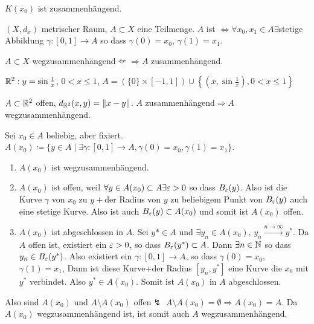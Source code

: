 \begin{bemerkung*}
$ K(x_0) $ ist zusammenh\"angend.
\end{bemerkung*}
\begin{definition}
$ (X,d_x) $ metrischer Raum, $ A\subset X $ eine Teilmenge. $ A $ ist $ \Leftrightarrow\forall x_0,x_1\in A \exists$stetige Abbildung $ \gamma\colon[0,1]\rightarrow A $ so dass $ \gamma(0)=x_0 $, $ \gamma(1)=x_1 $.
\end{definition}
\begin{bemerkung*}
$ A\subset X $ wegzusammenh\"angend$ \nLeftarrow\Rightarrow A$ zusammenh\"angend.
\begin{beispiel*}
$ \mathbb{R}^2: y=\sin\frac{1}{x} $, $ 0<x\leq 1 $, $ A=(\lbrace 0\rbrace\times[-1,1])\cup\left\lbrace\left(x,\sin\frac{1}{x}\right),0<x\leq 1\right\rbrace $
\end{beispiel*}
\end{bemerkung*}
\begin{proposition}
$ A\subset\mathbb{R}^2 $ offen, $ d_{\mathbb{R}^2} (x,y)=\left\|x-y\right\|$. $ A $ zusammenh\"angend$ \Rightarrow A $ wegzusammenh\"angend.
\end{proposition}
\begin{beweis}
Sei $ x_0\in A $ beliebig, aber fixiert. $ A(x_0)\coloneqq\lbrace y\in A\mid\exists\gamma\colon[0,1]\rightarrow A, \gamma(0)=x_0,\gamma(1)=x_1\rbrace $.
\begin{enumerate}
\item $ A(x_0) $ ist wegzusammenh\"angend.
\item $ A(x_0) $ ist offen, weil $ \forall y\in A(x_0)\subset A\exists\varepsilon>0 $ so dass $ B_\varepsilon(y) $. Also ist die Kurve $ \gamma $ von $ x_0 $ zu $ y +$der Radius von $ y $ zu beliebigem Punkt von $ B_\varepsilon(y) $ auch eine stetige Kurve. Also ist auch $ B_\varepsilon(y)\subset A(x_0) $ und somit ist $ A(x_0) $ offen.
\item $ A(x_0) $ ist abgeschlossen in $ A $. Sei $ y\ast\in A $ und $ \exists y_n\in A(x_0) $, $ y_n\xrightarrow{n\to\infty}y^\ast $. Da $ A $ offen ist, existiert ein $ \varepsilon>0 $, so dass $ B_\varepsilon(y^\ast)\subset A $. Dann $ \exists n\in\mathbb{N} $ so dass $ y_n\in B_\varepsilon(y^\ast) $. Also existiert ein $ \gamma\colon[0,1]\rightarrow A $, so dass $ \gamma(0)=x_0 $, $ \gamma(1)=x_1 $, Dann ist diese Kurve+der Radius $ [y_n,y^\ast] $ eine Kurve die $ x_0 $ mit $ y^\ast $ verbindet. Also $ y^\ast\in A(x_0) $. Somit ist $ A(x_0) $ in $ A $ abgeschlossen.
\end{enumerate}
Also sind $ A(x_0) $ und $ A\setminus A(x_0) $ offen$ \lightning $ $ A\setminus A(x_0)=\emptyset \Rightarrow A(x_0)=A$. Da $ A(x_0) $ wegzusammenh\"angend ist, ist somit auch $ A $ wegzusammenh\"angend.
\end{beweis}
